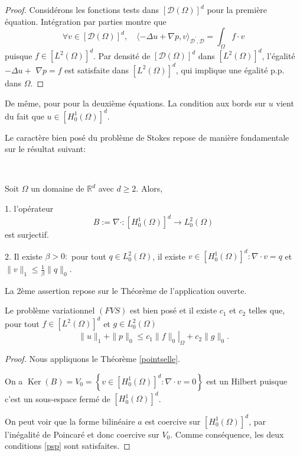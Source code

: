 \begin{proof}
Considérons les  fonctions  tests dans  $[\mathcal{D}(\Omega)]^{d}$ pour la première équation. Intégration par parties  montre que 
$$
\forall v \in[\mathcal{D}(\Omega)]^{d}, \quad\langle-\Delta u+\nabla p, v\rangle_{\mathcal{D}^{\prime}, \mathcal{D}}=\int_{\Omega} f \cdot v
$$
puisque $f \in\left[L^{2}(\Omega)\right]^{d}$. Par densité de  $[\mathcal{D}(\Omega)]^{d}$ dans  $\left[L^{2}(\Omega)\right]^{d}$, l'égalité  $-\Delta u+$ $\nabla p=f$ est satisfaite dans  $\left[L^{2}(\Omega)\right]^{d}$,  qui implique une égalité p.p.  dans  $\Omega$. 
\end{proof}


De même, pour pour la deuxième équations.  La condition aux bords sur  $u$ vient du fait que  $u\in \left[H_{0}^{1}(\Omega)\right]^{d}$.

Le caractère bien posé du problème de Stokes  repose de manière fondamentale sur le résultat suivant: 

\begin{lemma}\label{lemmeAO}\


Soit $\Omega$ un domaine de $\mathbb{R}^{d}$ avec $d \geqslant 2 .$
 Alors, 
 
 
 1. l'opérateur
$$
B:=\nabla \cdot:\left[H_{0}^{1}(\Omega)\right]^{d} \longrightarrow L_{0}^{2}(\Omega)
$$
est surjectif.

2.  Il existe $\beta>0: $ pour tout $q\in L_{0}^{2}(\Omega)$, il existe $v\in  \left[H_{0}^{1}(\Omega)\right]^{d}  : \nabla \cdot v=q$ et $\|v\|_{1}\leq \frac1\beta \|q\|_0$.
\end{lemma}	

La 2ème assertion repose sur le Théorème de l'application ouverte.


\begin{theorem}
	
Le problème variationnel $(FVS)$ est bien posé et  il existe $c_{1}$ et  $c_{2}$ telles que, pour tout  $f \in\left[L^{2}(\Omega)\right]^{d}$ et  $g \in L_{0}^{2}(\Omega)$
$$
\|u\|_{1}+\|p\|_{0} \leq\left. c_{1}\|f\|_{0}\right|_{\Omega}+c_{2}\|g\|_{0}. 
$$

\end{theorem}


\begin{proof}
Nous appliquons le Théorème \ref{pointselle}. 

On a  $\operatorname{Ker}(B)=V_{0}=\left\{v \in\left[H_{0}^{1}(\Omega)\right]^{d} : \nabla \cdot v=0\right\} $ est un Hilbert puisque c'est un sous-espace fermé de  $\left[H_{0}^{1}(\Omega)\right]^{d}$.

On peut voir que la forme bilinéaire $a$ est  coercive sur  $\left[H_{0}^{1}(\Omega)\right]^{d}$, par l'inégalité de  Poincaré et donc  coercive sur  $V_{0}$.  Comme conséquence, les deux conditions \eqref{psp} sont satisfaites. 
\end{proof}

